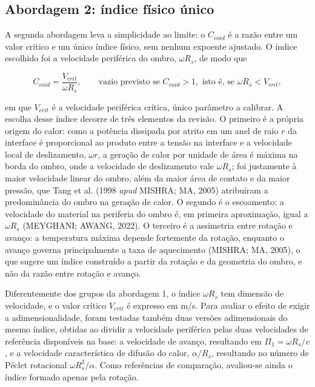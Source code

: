 \documentclass[12pt,openany]{report}
\begin{document}
\subsection{Abordagem 2: índice físico único}
\label{sec:abordagem_a}

A segunda abordagem leva a simplicidade ao limite: o $C_{void}$ é a razão entre um valor crítico e um único índice físico, sem nenhum expoente ajustado. O índice escolhido foi a velocidade periférica do ombro, $\omega R_s$, de modo que

\begin{equation}
C_{void} = \frac{V_{crit}}{\omega R_s}, \qquad \text{vazio previsto se } C_{void} > 1, \text{ isto é, se } \omega R_s < V_{crit},
\label{eq:cvoid_a}
\end{equation}

\noindent em que $V_{crit}$ é a velocidade periférica crítica, único parâmetro a calibrar. A escolha desse índice decorre de três elementos da revisão. O primeiro é a própria origem do calor: como a potência dissipada por atrito em um anel de raio $r$ da interface é proporcional ao produto entre a tensão na interface e a velocidade local de deslizamento, $\omega r$, a geração de calor por unidade de área é máxima na borda do ombro, onde a velocidade de deslizamento vale $\omega R_s$; foi justamente à maior velocidade linear do ombro, além da maior área de contato e da maior pressão, que Tang et al. (1998 \textit{apud} MISHRA; MA, 2005) atribuíram a predominância do ombro na geração de calor. O segundo é o escoamento: a velocidade do material na periferia do ombro é, em primeira aproximação, igual a $\omega R_s$ (MEYGHANI; AWANG, 2022). O terceiro é a assimetria entre rotação e avanço: a temperatura máxima depende fortemente da rotação, enquanto o avanço governa principalmente a taxa de aquecimento (MISHRA; MA, 2005), o que sugere um índice construído a partir da rotação e da geometria do ombro, e não da razão entre rotação e avanço.

Diferentemente dos grupos da abordagem 1, o índice $\omega R_s$ tem dimensão de velocidade, e o valor crítico $V_{crit}$ é expresso em m/s. Para avaliar o efeito de exigir a adimensionalidade, foram testadas também duas versões adimensionais do mesmo índice, obtidas ao dividir a velocidade periférica pelas duas velocidades de referência disponíveis na base: a velocidade de avanço, resultando em $\Pi_1 = \omega R_s/v$, e a velocidade característica de difusão do calor, $\alpha/R_s$, resultando no número de Péclet rotacional $\omega R_{s}^{2}/\alpha$. Como referências de comparação, avaliou-se ainda o índice formado apenas pela rotação.
\end{document}
